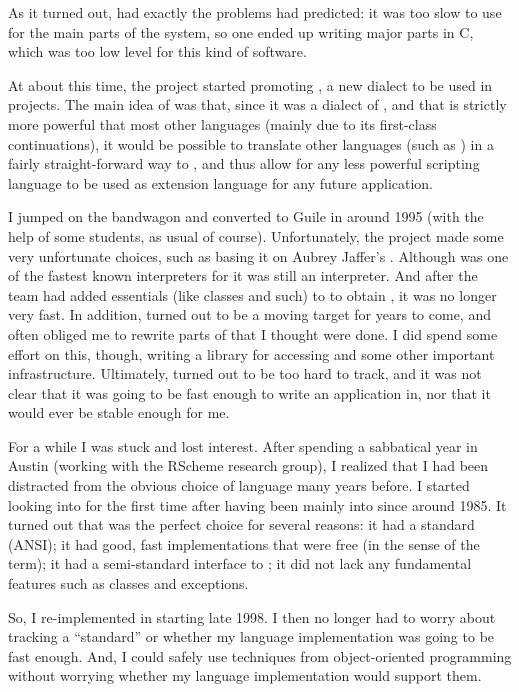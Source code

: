 As it turned out, {\elk} had exactly the problems {\rms} had
predicted: it was too slow to use for the main parts of the system, so
one ended up writing major parts in C, which was too low level for
this kind of software. 

At about this time, the {\gnu} project started promoting {\guile}, 
a new {\scheme} dialect to be used in {\gnu} projects.  The main idea
of {\guile} was that, since it was a dialect of {\scheme}, and that
{\scheme} is strictly more powerful that most other languages (mainly
due to its first-class continuations), it would be possible to
translate other languages (such as {\tcl}) in a fairly
straight-forward way to {\guile}, and thus allow for any less powerful
scripting language to be used as extension language for any future
{\gnu} application. 

I jumped on the {\guile} bandwagon and converted \sysname{} to Guile in
around 1995 (with the help of some students, as usual of course).
Unfortunately, the {\guile} project made some very unfortunate
choices, such as basing it on Aubrey Jaffer's {\scm}.  Although {\scm}
was one of the fastest known interpreters for {\scheme} it was still
an interpreter.  And after the {\guile} team had added essentials
(like classes and such) to {\scm} to obtain {\guile}, it was no longer
very fast.  In addition, {\guile} turned out to be a moving target for
years to come, and often obliged me to rewrite parts of \sysname{} that I
thought were done.  I did spend some effort on this, though, writing a
library for accessing {\xwin} and some other important
infrastructure.  Ultimately, {\guile} turned out to be too hard to
track, and it was not clear that it was going to be fast enough to
write an application in, nor that it would ever be stable enough for
me. 

For a while I was stuck and lost interest.  After spending a
sabbatical year in Austin (working with the RScheme research group), I
realized that I had been distracted from the obvious choice of
language many years before.  I started looking into {\commonlisp} for the
first time after having been mainly into {\scheme} since around 1985.
It turned out that {\commonlisp} was the perfect choice for several reasons:
it had a standard (ANSI); it had good, fast implementations that were
free (in the {\gnu} sense of the term); it had a semi-standard
interface to {\xwin}; it did not lack any fundamental features such as
classes and exceptions. 

So, I re-implemented \sysname{} in {\commonlisp} starting late 1998.  I then no
longer had to worry about tracking a ``standard'' or whether my
language implementation was going to be fast enough.  And, I could
safely use techniques from object-oriented programming without
worrying whether my language implementation would support them. 

